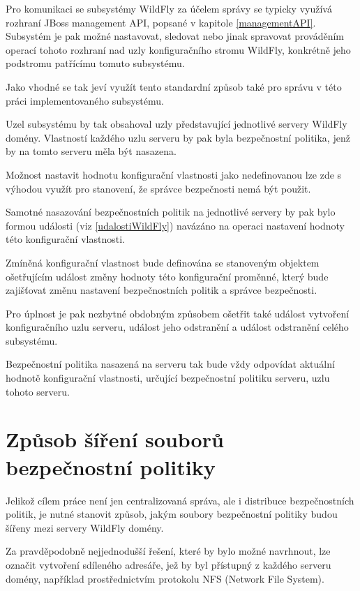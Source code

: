 Pro komunikaci se subsystémy WildFly za účelem správy se typicky využívá rozhraní JBoss management API, popsané v kapitole \ref{managementAPI}.
Subsystém je pak možné nastavovat, sledovat nebo jinak spravovat prováděním operací tohoto rozhraní nad uzly konfiguračního stromu WildFly,
konkrétně jeho podstromu patřícímu tomuto subsystému.
\cite{jbossDetypedManagement}

Jako vhodné se tak jeví využít tento standardní způsob také pro správu v této práci implementovaného subsystému.

Uzel subsystému by tak obsahoval uzly představující jednotlivé servery WildFly domény.
Vlastností každého uzlu serveru by pak byla bezpečnostní politika, jenž by na tomto serveru měla být nasazena.

Možnost nastavit hodnotu konfigurační vlastnosti jako nedefinovanou lze zde s výhodou využít pro stanovení, že správce bezpečnosti nemá být použit.

Samotné nasazování bezpečnostních politik na jednotlivé servery by pak bylo formou události (viz \ref{udalostiWildFly})
navázáno na operaci nastavení hodnoty této konfigurační vlastnosti.

Zmíněná konfigurační vlastnost bude definována se stanoveným objektem ošetřujícím událost změny hodnoty této konfigurační proměnné, který bude zajišťovat
změnu nastavení bezpečnostních politik a správce bezpečnosti.

Pro úplnost je pak nezbytné obdobným způsobem ošetřit také událost vytvoření konfiguračního uzlu serveru, událost jeho odstranění a událost odstranění
celého subsystému.

Bezpečnostní politika nasazená na serveru tak bude vždy odpovídat aktuální hodnotě konfigurační vlastnosti, určující bezpečnostní politiku serveru, uzlu tohoto serveru.

\section{Způsob šíření souborů bezpečnostní politiky} \label{sireniSouboru}

Jelikož cílem práce není jen centralizovaná správa, ale i distribuce bezpečnostních politik, je nutné stanovit způsob, jakým soubory bezpečnostní politiky budou šířeny mezi servery WildFly domény.

Za pravděpodobně nejjednodušší řešení, které by bylo možné navrhnout, lze označit vytvoření sdíleného adresáře, jež by byl přístupný z každého serveru domény, například prostřednictvím protokolu NFS (Network File System).

